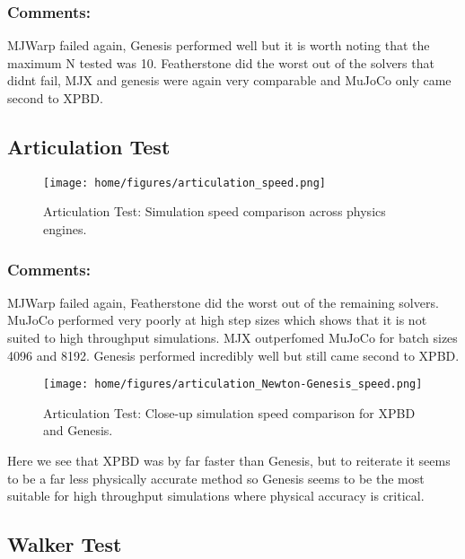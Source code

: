\documentclass[11pt,a4paper]{article}
\begin{document}
\subsubsection{Comments:}
MJWarp failed again, Genesis performed well but it is worth noting that the maximum N tested was 10. Featherstone did the worst out of the solvers that didnt fail, MJX and genesis were again very comparable and MuJoCo only came second to XPBD.

\subsection{Articulation Test}
\begin{figure}[H]
    \centering
    \texttt{[image: home/figures/articulation\_speed.png]}
    \caption{Articulation Test: Simulation speed comparison across physics engines.}
    \label{fig:articulation_speed_comparison}
\end{figure}

\subsubsection{Comments:}
MJWarp failed again, Featherstone did the worst out of the remaining solvers. MuJoCo performed very poorly at high step sizes which shows that it is not suited to high throughput simulations. MJX outperfomed MuJoCo for batch sizes 4096 and 8192. Genesis performed incredibly well but still came second to XPBD.
\begin{figure}[H]
    \centering
    \texttt{[image: home/figures/articulation\_Newton-Genesis\_speed.png]}
    \caption{Articulation Test: Close-up simulation speed comparison for XPBD and Genesis.}
    \label{fig:articulation_speed_comparison}
\end{figure}
Here we see that XPBD was by far faster than Genesis, but to reiterate it seems to be a far less physically accurate method so Genesis seems to be the most suitable for high throughput simulations where physical accuracy is critical.

\subsection{Walker Test}
\begin{figure}[H]
    \centering
\end{figure}
\end{document}
